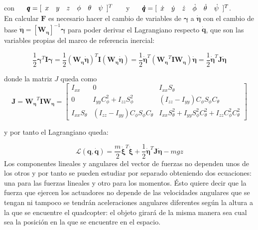 \documentclass[twoside,11pt]{book}
\begin{document}
con $ \hspace{0.5cm} \pmb{q}=[\begin{array}{cccccc}
x & y & z & \phi & \theta & \psi
\end{array} ]^{T} \hspace{0.5cm}$ y $ \hspace{0.5cm} \pmb{\dot{q}}=[\begin{array}{cccccc}
\dot{x} & \dot{y} & \dot{z} & \dot{\phi} & \dot{\theta} & \dot{\psi}
\end{array} ]^{T}$.\\

En calcular $\pmb{F}$ es necesario hacer el cambio de variables de $\pmb{\gamma}$ a $\pmb{\dot{\eta}}$ con el cambio de base $\pmb{\dot{\eta}}=\left[ \pmb{W_\eta} \right]^{-1} \pmb{\gamma}$ para poder derivar el Lagrangiano respecto $\pmb{\dot{q}}$, que son las variables propias del marco de referencia inercial:

\begin{equation}
\frac{1}{2}\pmb{\gamma}^{T}\pmb{I}\pmb{\gamma} = \frac{1}{2}(\pmb{W_\eta} \pmb{\dot{\eta}})^{T}\pmb{I}(\pmb{W_\eta} \pmb{\dot{\eta}}) = \frac{1}{2}\pmb{\dot{\eta}}^{T}(\pmb{W_\eta} ^{T}\pmb{I}\pmb{W_\eta})\pmb{\dot{\eta}} = \frac{1}{2}\pmb{\dot{\eta}}^{T}\pmb{J}\pmb{\dot{\eta}}
\end{equation}

donde la matriz $J$ queda como
\begin{equation}
\pmb{J}=\pmb{W_\eta} ^{T}\pmb{I}\pmb{W_\eta} = \left[ \begin{array}{ccc}
I_{xx} & 0 & I_{xx} S_\theta \\
0 & I_{yy} C^2_\phi + I_{zz} S^2_\phi & (I_{zz}-I_{yy}) C_{\phi} S_\phi C_\theta \\
I_{xx} S_\theta & (I_{zz}-I_{yy}) C_{\phi} S_\phi C_\theta & I_{xx} S^2_{\theta}+I_{yy} S^2_{\phi} C^2_\theta +I_{zz}C^2_{\phi} C^2_{\theta}
\end{array} \right]
\end{equation} 

y por tanto el Lagrangiano queda:

\begin{equation}
\mathcal{L}(\pmb{q},\pmb{\dot{q}})=\frac{m}{2} \pmb{\dot{\xi}}^T \pmb{\dot{\xi}} + \frac{1}{2}\pmb{\dot{\eta}}^{T}\pmb{J}\pmb{\dot{\eta}} - mgz
\end{equation}
Los componentes lineales y angulares del vector de fuerzas no dependen unos de los otros y por tanto se pueden estudiar por separado obteniendo dos ecuaciones: una para las fuerzas lineales y otro para los momentos. Ésto quiere decir que la fuerza que ejercen los actuadores no depende de las velocidades angulares que se tengan ni tampoco se tendrán aceleraciones angulares diferentes según la altura a la que se encuentre el quadcopter: el objeto girará de la misma manera sea cual sea la  posición en la que se encuentre en el espacio.
\end{document}

